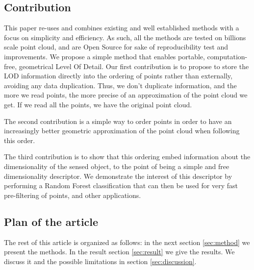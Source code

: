 	
	\subsection{Contribution}
		This paper re-uses and combines existing and well established methods with a focus on simplicity and efficiency. As such, all the methods are tested on billions scale point cloud, and are Open Source for sake of reproducibility test and improvements.
		We propose a simple method that enables portable, computation-free, geometrical Level Of Detail.
		Our first contribution is to propose to store the LOD information directly into the ordering of points rather than externally, avoiding any data duplication.
		Thus, we don't duplicate information, and the more we read points, the more precise of an approximation of the point cloud we get. If we read all the points, we have the original point cloud.
		
		The second contribution is a simple way to order points in order to have an increasingly better geometric approximation of the point cloud when following this order.
		
		The third contribution is to show that this ordering embed information about the dimensionality of the sensed object,
		to the point of being a simple and free dimensionality descriptor.
		We demonstrate the interest of this descriptor by performing a Random Forest classification that can then be used for very fast pre-filtering of points, and other applications.
			
		
	\subsection{Plan of the article}
		The rest of this article is organized as follows:
		in the next section \ref{sec:method} we present the methods.  
		In the result section \ref{sec:result} we give the results.
		We discuss it and the possible limitations in section \ref{sec:discussion}. 
